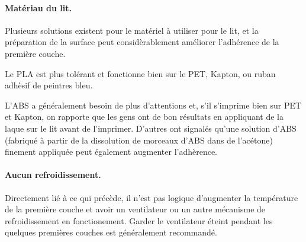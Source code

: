 \paragraph{Matériau du lit.} %
\label{par:bed_material}
Plusieurs solutions existent pour le matériel à utiliser pour le lit, et la préparation de la surface peut considèrablement améliorer l'adhérence de la première couche.

Le PLA est plus tolérant et fonctionne bien sur le PET, Kapton, ou ruban adhèsif de peintres bleu.


L'ABS a généralement besoin de plus d'attentions et, s'il s'imprime bien sur PET et Kapton, on rapporte que les gens ont de bon résultats en appliquant de la laque sur le lit avant de l'imprimer. D'autres ont signalés qu'une solution d'ABS (fabriqué à partir de la dissolution de morceaux d'ABS dans de l'acétone) finement appliquée peut également augmenter l'adhèrence.

\paragraph{Aucun refroidissement.} %
\label{par:no_cooling}
Directement lié à ce qui précède, il n'est pas logique d'augmenter la température de la première couche et avoir un ventilateur ou un autre mécanisme de refroidissement en fonctionement. Garder le ventilateur éteint pendant les quelques premières couches est généralement recommandé.
